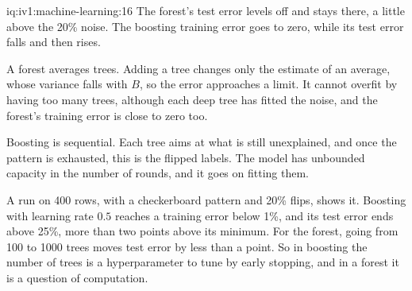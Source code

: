 \begin{solution}{iq:iv1:machine-learning:16}
The forest's test error levels off and stays there, a little above the 20\% noise. The boosting training error goes to zero, while its test error falls and then rises.

A forest averages trees. Adding a tree changes only the estimate of an average, whose variance falls with $B$, so the error approaches a limit. It cannot overfit by having too many trees, although each deep tree has fitted the noise, and the forest's training error is close to zero too.

Boosting is sequential. Each tree aims at what is still unexplained, and once the pattern is exhausted, this is the flipped labels. The model has unbounded capacity in the number of rounds, and it goes on fitting them.

A run on 400 rows, with a checkerboard pattern and 20\% flips, shows it. Boosting with learning rate $0.5$ reaches a training error below 1\%, and its test error ends above 25\%, more than two points above its minimum. For the forest, going from 100 to 1000 trees moves test error by less than a point. So in boosting the number of trees is a hyperparameter to tune by early stopping, and in a forest it is a question of computation.



\end{solution}


